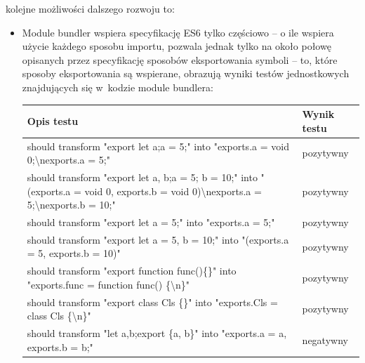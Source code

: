 \documentclass{SGGW-thesis}
\begin{document}
kolejne możliwości dalszego rozwoju to:
\begin{itemize}
    \item Module bundler wspiera specyfikację ES6 tylko częściowo -- o ile wspiera użycie każdego sposobu importu, pozwala jednak tylko na około połowę opisanych przez specyfikację sposobów eksportowania symboli -- to, które sposoby eksportowania są wspierane, obrazują wyniki testów jednostkowych znajdujących się w~kodzie module bundlera:
        \begin{longtable}{|p{13cm}|p{2cm}|}
            \hline
            \textbf{Opis testu}                                                                                                                                              & \textbf{Wynik testu} \\ \hline
            \endfirsthead
            \endhead
            should transform "export let a;a = 5;" into "exports.a = void 0;\textbackslash{}nexports.a = 5;"                                                                 & pozytywny            \\ \hline
            should transform "export let a, b;a = 5; b = 10;" into "(exports.a = void 0, exports.b = void 0)\textbackslash{}nexports.a = 5;\textbackslash{}nexports.b = 10;" & pozytywny            \\ \hline
            should transform "export let a = 5;" into "exports.a = 5;"                                                                                                       & pozytywny            \\ \hline
            should transform "export let a = 5, b = 10;" into "(exports.a = 5, exports.b = 10)"                                                                              & pozytywny            \\ \hline
            should transform "export function func()\{\}" into "exports.func = function func() \{\textbackslash{}n\}"                                                        & pozytywny            \\ \hline
            should transform "export class Cls \{\}" into "exports.Cls = class Cls \{\textbackslash{}n\}"                                                                    & pozytywny            \\ \hline
            should transform "let a,b;export \{a, b\}" into "exports.a = a, exports.b = b;"                                                                                  & negatywny            \\ \hline

\end{longtable}
\end{itemize}
\end{document}
